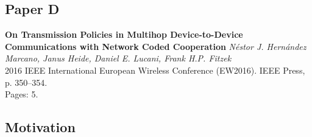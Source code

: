 \subsection{Paper D}
\textbf{On Transmission Policies in Multihop Device-to-Device Communications
with Network Coded Cooperation}
\textit{N\'estor J. Hern\'andez Marcano, Janus Heide, Daniel E. Lucani, Frank H.P. Fitzek}
\\  2016 IEEE International European Wireless Conference (EW2016). IEEE Press, p. 350--354.
\\ Pages: 5.
\subsection*{Motivation}

